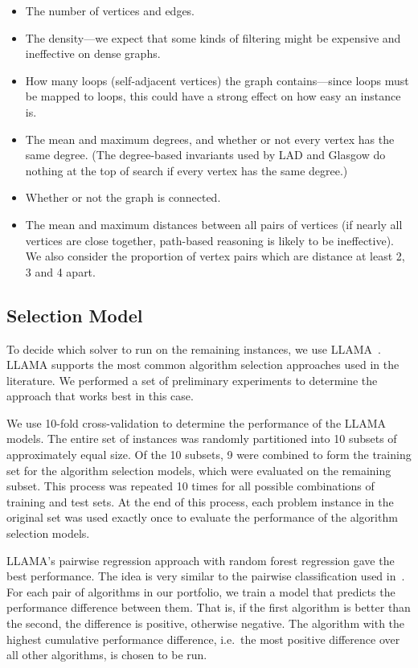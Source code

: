 \documentclass{llncs}
\begin{document}
\begin{itemize}
    \item The number of vertices and edges.
    \item The density---we expect that some kinds of filtering might be expensive and ineffective on
        dense graphs.
    \item How many loops (self-adjacent vertices) the graph contains---since loops must be mapped to
        loops, this could have a strong effect on how easy an instance is.
    \item The mean and maximum degrees, and whether or not every vertex has the same degree. (The
        degree-based invariants used by LAD and Glasgow do nothing at the top of search if every
        vertex has the same degree.)
    \item Whether or not the graph is connected.
    \item The mean and maximum distances between all pairs of vertices (if nearly all vertices are
        close together, path-based reasoning is likely to be ineffective). We also consider the
        proportion of vertex pairs which are distance at least 2, 3 and 4 apart.
\end{itemize}

\subsection{Selection Model}

To decide which solver to run on the remaining instances, we use
LLAMA~\cite{kotthoff_llama_2013}. LLAMA supports the most common algorithm
selection approaches used in the literature. We performed a set of preliminary
experiments to determine the approach that works best in this case.

We use 10-fold cross-validation to determine the performance of the LLAMA
models. The entire set of instances was randomly partitioned into 10 subsets of
approximately equal size. Of the 10 subsets, 9 were combined to form the
training set for the algorithm selection models, which were evaluated on the
remaining subset. This process was repeated 10 times for all possible
combinations of training and test sets. At the end of this process, each problem
instance in the original set was used exactly once to evaluate the performance
of the algorithm selection models.

LLAMA's pairwise regression approach with random forest regression gave the best
performance. The idea is very similar to the pairwise classification used
in~\cite{xu_satzilla_2008}. For each pair of algorithms in our portfolio, we
train a model that predicts the performance difference between them. That is, if
the first algorithm is better than the second, the difference is positive,
otherwise negative. The algorithm with the highest cumulative performance
difference, i.e.\ the most positive difference over all other algorithms, is
chosen to be run.
\end{document}

